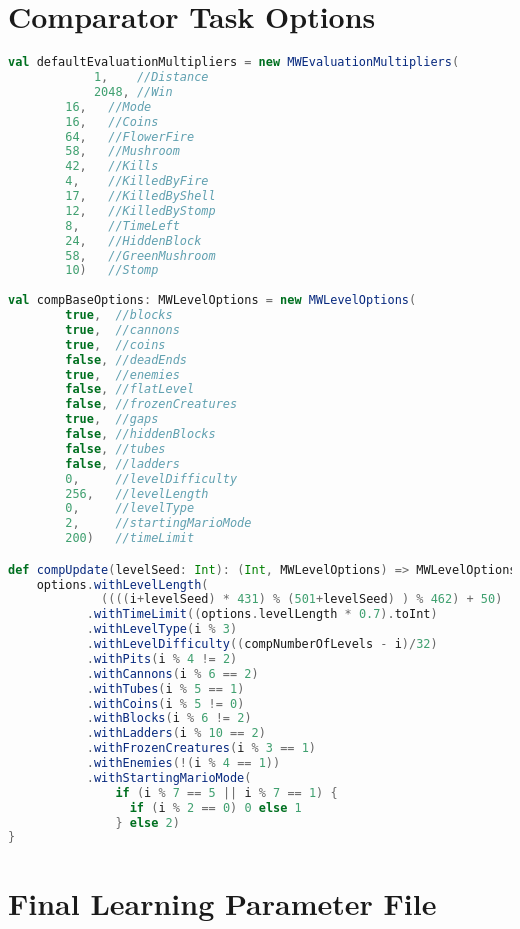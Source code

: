 \begin{appendices}
\section{Comparator Task Options}
\label{app:comptask}
\setcounter{lstlisting}{0}


\begin{minipage}{0.9\linewidth}
\begin{lstlisting}[language=scala, basicstyle=\scriptsize\ttfamily, caption=Parameter classes for the comparator task described in Section \ref{subsec:comptask}]
val defaultEvaluationMultipliers = new MWEvaluationMultipliers(
        	1,    //Distance
        	2048, //Win
		16,   //Mode
		16,   //Coins
		64,   //FlowerFire
		58,   //Mushroom
		42,   //Kills
		4,    //KilledByFire
		17,   //KilledByShell
		12,   //KilledByStomp
		8,    //TimeLeft
		24,   //HiddenBlock
		58,   //GreenMushroom
		10)   //Stomp
		
val compBaseOptions: MWLevelOptions = new MWLevelOptions(
		true,  //blocks
		true,  //cannons
		true,  //coins
		false, //deadEnds
		true,  //enemies
		false, //flatLevel
		false, //frozenCreatures
		true,  //gaps
		false, //hiddenBlocks
		false, //tubes
		false, //ladders
		0,     //levelDifficulty
		256,   //levelLength
		0,     //levelType
		2,     //startingMarioMode
		200)   //timeLimit

def compUpdate(levelSeed: Int): (Int, MWLevelOptions) => MWLevelOptions = (i: Int, options: MWLevelOptions) => {
    options.withLevelLength(
             ((((i+levelSeed) * 431) % (501+levelSeed) ) % 462) + 50)
           .withTimeLimit((options.levelLength * 0.7).toInt)
           .withLevelType(i % 3)
           .withLevelDifficulty((compNumberOfLevels - i)/32)
           .withPits(i % 4 != 2)
           .withCannons(i % 6 == 2)
           .withTubes(i % 5 == 1)
           .withCoins(i % 5 != 0)
           .withBlocks(i % 6 != 2)
           .withLadders(i % 10 == 2)
           .withFrozenCreatures(i % 3 == 1)
           .withEnemies(!(i % 4 == 1))
           .withStartingMarioMode(
               if (i % 7 == 5 || i % 7 == 1) {
                 if (i % 2 == 0) 0 else 1
               } else 2)
}
\end{lstlisting}
\end{minipage}


\section{Final Learning Parameter File}
\label{app:paramfile}


\end{appendices}
